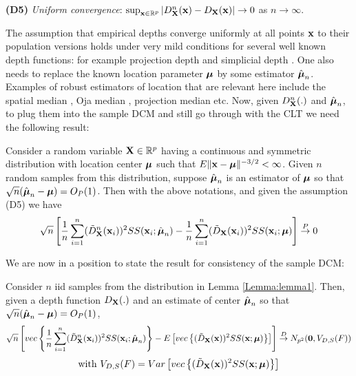 \documentclass[fleqn,11pt]{article}
\begin{document}
\vspace{1em}
\noindent\textbf{(D5)} \textit{Uniform convergence}: $\sup_{{\bf{x}} \in \mathbb R^p} | D^n_{\mathbf{X}} ({\bf{x}}) - D_{\mathbf{X}} ({\bf{x}}) | \rightarrow 0$ as $n \rightarrow \infty $.
\vspace{1em}

The assumption that empirical depths converge uniformly at all points ${\bf{x}}$ to their population versions holds under very mild conditions for several well known depth functions: for example projection depth \citep{zuo03} and simplicial depth \citep{Dumbgen92}. One also needs to replace the known location parameter ${\boldsymbol{\mu}}$ by some estimator $\hat{{\boldsymbol{\mu}}}_n$. Examples of robust estimators of location that are relevant here include the spatial median \citep{haldane48,brown83}, Oja median \citep{oja83}, projection median \citep{zuo03} etc. Now, given $D^n_{\mathbf{X}}(.)$ and $\hat {{\boldsymbol{\mu}}}_n$, to plug them into the sample DCM and still go through with the CLT we need the following result:

\begin{Lemma} \label{Lemma:lemma1}
Consider a random variable ${\mathbf{X}} \in \mathbb{R}^p$ having a continuous and symmetric distribution with location center ${\boldsymbol{\mu}}$ such that $E\|{\bf{x}} - {\boldsymbol{\mu}} \|^{-3/2} < \infty$. Given $n$ random samples from this distribution, suppose $\hat{{\boldsymbol{\mu}}}_n$ is an estimator of ${\boldsymbol{\mu}}$ so that $\sqrt n (\hat{{\boldsymbol{\mu}}}_n - {\boldsymbol{\mu}}) = O_P(1) $. Then with the above notations, and given the assumption (D5) we have
%
$$ \sqrt n \left[
\frac{1}{n} \sum_{i=1}^n (\tilde D^n_{\mathbf{X}} ({\bf{x}}_i))^2 SS({\bf{x}}_i; \hat{{\boldsymbol{\mu}}}_n) -
\frac{1}{n} \sum_{i=1}^n (\tilde D_{\mathbf{X}} ({\bf{x}}_i))^2 SS({\bf{x}}_i; {\boldsymbol{\mu}}) \right]
\stackrel{P}{\rightarrow} 0 $$
\end{Lemma}

We are now in a position to state the result for consistency of the sample DCM:

\begin{Theorem} \label{Theorem:rootn}
Consider $n$ iid samples from the distribution in Lemma \ref{Lemma:lemma1}. Then, given a depth function $D_{\mathbf{X}}(.)$ and an estimate of center $\hat{{\boldsymbol{\mu}}}_n$ so that $\sqrt n(\hat {{\boldsymbol{\mu}}}_n - {\boldsymbol{\mu}}) = O_P(1)$,
%
$$ \sqrt n \left[ vec\left\{ \frac{1}{n} \sum_{i=1}^n (\tilde D^n_{\mathbf{X}} ({\bf{x}}_i))^2 SS({\bf{x}}_i; \hat{{\boldsymbol{\mu}}}_n) \right\} - E \left[ vec\left\{ (\tilde D_{\mathbf{X}} ({\bf{x}}))^2 SS({\bf{x}}; {\boldsymbol{\mu}}) \right\} \right] \right]
\stackrel{D}{\rightarrow}
N_{p^2} ({\bf 0}, V_{D,S}(F)) $$
$$ \text{with } V_{D,S}(F) = Var \left[vec \left\{ (\tilde D_{\mathbf{X}} ({\bf{x}}))^2 SS({\bf{x}}; {\boldsymbol{\mu}}) \right\} \right] $$
\end{Theorem}
\end{document}
